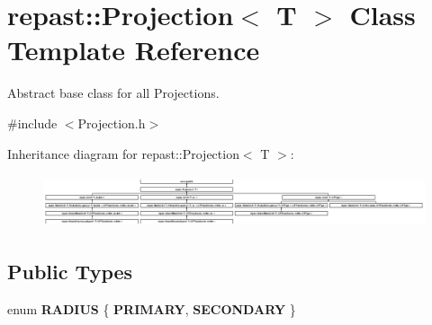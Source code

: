 \hypertarget{classrepast_1_1_projection}{\section{repast\-:\-:Projection$<$ T $>$ Class Template Reference}
\label{classrepast_1_1_projection}
}


Abstract base class for all Projections.  




{\ttfamily \#include $<$Projection.\-h$>$}

Inheritance diagram for repast\-:\-:Projection$<$ T $>$\-:\begin{figure}[H]
\begin{center}
\leavevmode
\includegraphics[height=1.552680cm]{classrepast_1_1_projection}
\end{center}
\end{figure}
\subsection*{Public Types}
\begin{DoxyCompactItemize}
\item 
enum {\bfseries R\-A\-D\-I\-U\-S} \{ {\bfseries P\-R\-I\-M\-A\-R\-Y}, 
{\bfseries S\-E\-C\-O\-N\-D\-A\-R\-Y}
 \}
\end{DoxyCompactItemize}

